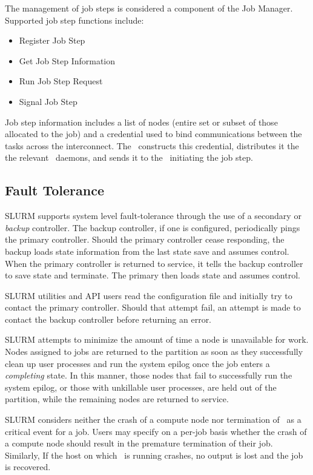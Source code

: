 \documentclass[10pt,onecolumn,times]{../common/llncs}
\begin{document}
{The management of job steps is considered a component of the Job Manager.
Supported job step functions include:
\begin{itemize}
\item Register Job Step
\item Get Job Step Information
\item Run Job Step Request
\item Signal Job Step
\end{itemize}

Job step information includes a list of nodes (entire set or subset of
those allocated to the job) and a credential used to bind communications
between the tasks across the interconnect. The \slurmctld\ constructs
this credential, distributes it the the relevant \slurmd\ daemons,
and sends it to the \srun\ initiating the job step.

\subsection{Fault Tolerance}
SLURM supports system level fault-tolerance through the use of a secondary
or {\em backup} controller.  The backup controller, if one is configured,
periodically pings the primary controller.  Should the primary controller
cease responding, the backup loads state information from the last state
save and assumes control.  When the primary controller is returned to
service, it tells the backup controller to save state and terminate.
The primary then loads state and assumes control.

SLURM utilities and API users read the configuration file and initially try
to contact the primary controller.  Should that attempt fail, an attempt
is made to contact the backup controller before returning an error.

SLURM attempts to minimize the amount of time a node is unavailable
for work.  Nodes assigned to jobs are returned to the partition as
soon as they successfully clean up user processes and run the system
epilog once the job enters a {\em completing} state.  In this manner,
those nodes that fail to successfully run the system epilog, or those
with unkillable user processes, are held out of the partition, while
the remaining nodes are returned to service.

SLURM considers neither the crash of a compute node nor termination
of \srun\ as a critical event for a job. Users may specify on a per-job
basis whether the crash of a compute node should result in the premature
termination of their job. Similarly, If the host on which \srun\ is
running crashes, no output is lost and the job is recovered.


}
\end{document}

